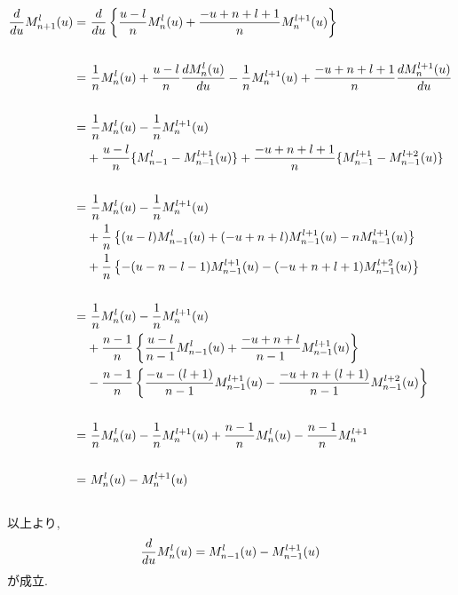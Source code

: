 \begin{align}
   \frac{d}{du} M_{n+1}^{l}(u)
=&~
   \frac{d}{du}
   \left\{
           \frac{u-l}{n} M_{n}^{l}(u) + \frac{-u+n+l+1}{n} M_{n}^{l+1}(u)
   \right\}
 \notag \\
 \notag \\
=&~
    \frac{1}{n} M_{n}^{l}(u)
  + \frac{u-l}{n} \frac{d M_{n}^{l}(u)}{du}
  - \frac{1}{n}M_{n}^{l+1}(u)
  + \frac{-u+n+l+1}{n} \frac{d M_{n}^{l+1}(u)}{du}
 \notag \\
 \notag \\
=&~
    \frac{1}{n} M_{n}^{l}(u) - \frac{1}{n}M_{n}^{l+1}(u)
  \notag
  \\
 &+ \frac{u-l}{n} \{M_{n-1}^{l} - M_{n-1}^{l+1}(u)\}
  + \frac{-u+n+l+1}{n} \{M_{n-1}^{l+1} - M_{n-1}^{l+2}(u)\}
 \notag \\
 \notag \\
=&~
    \frac{1}{n}M_{n}^{l}(u) - \frac{1}{n}M_{n}^{l+1}(u)
  \notag
  \\
 &+ \frac{1}{n}
    \left\{
            (u-l) M_{n-1}^{l}(u) + (-u+n+l) M_{n-1}^{l+1}(u) - n M_{n-1}^{l+1}(u)
    \right\}
  \notag
  \\
 &+ \frac{1}{n}
    \left\{
    -(u-n-l-1) M_{n-1}^{l+1}(u) - (-u+n+l+1) M_{n-1}^{l+2}(u)
    \right\}
 \notag \\
 \notag \\
=&~
    \frac{1}{n} M_{n}^{l}(u) - \frac{1}{n} M_{n}^{l+1}(u)
  \notag
  \\
 &+ \frac{n-1}{n}
    \left\{
            \frac{u-l}{n-1} M_{n-1}^{l}(u) + \frac{-u+n+l}{n-1} M_{n-1}^{l+1}(u)
    \right\}
  \notag
  \\
 &- \frac{n-1}{n}
    \left\{
    \frac{-u-(l+1)}{n-1} M_{n-1}^{l+1}(u) - \frac{-u+n+(l+1)}{n-1} M_{n-1}^{l+2}(u)
    \right\}
 \notag \\
 \notag \\
=&~
    \frac{1}{n}M_{n}^{l}(u) - \frac{1}{n}M_{n}^{l+1}(u)
  + \frac{n-1}{n} M_{n}^{l}(u) - \frac{n-1}{n} M_{n}^{l+1}
 \notag \\
 \notag \\
=&~
    M_{n}^{l} (u) - M_{n}^{l+1}(u)
 \notag
\end{align}
\\
以上より,
\begin{equation}
  \frac{d}{du} M_{n}^{l}(u) = M_{n-1}^{l}(u) - M_{n-1}^{l+1}(u)
  \notag
\end{equation}
が成立.

\clearpage




